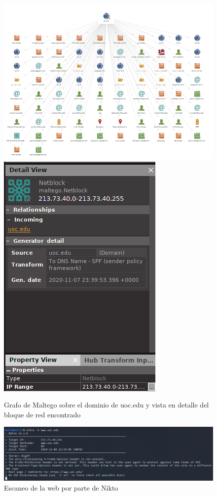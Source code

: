 \documentclass[10pt,a4paper]{article}
\begin{document}
\begin{figure}[h!]
  \centering
  \includegraphics[scale=0.4]{maltego.png}
  \includegraphics[scale=0.4]{maltego2.png}
  \caption{Grafo de Maltego sobre el dominio de uoc.edu y vista en detalle del bloque de red encontrado}
  \label{fig:otg-info-004-2}
\end{figure}

\begin{figure}[h!]
  \centering
  \includegraphics[scale=0.4]{nikto.png}
  \caption{Escaneo de la web por parte de Nikto}
  \label{fig:otg-info-004-3}
\end{figure}
\end{document}

